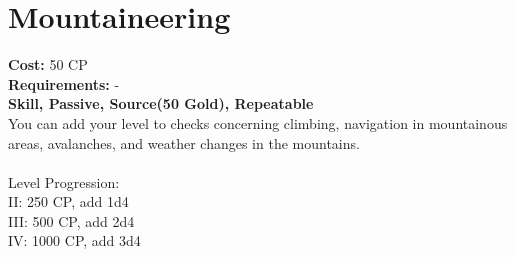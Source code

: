 \section{Mountaineering}
\textbf{Cost:} 50 CP\\
\textbf{Requirements:} -\\
\textbf{Skill, Passive, Source(50 Gold), Repeatable}\\
You can add your level to checks concerning climbing, navigation in mountainous areas, avalanches, and weather changes in the mountains.\\
\\
Level Progression:\\
II: 250 CP, add 1d4\\
III: 500 CP, add 2d4\\
IV: 1000 CP, add 3d4\\